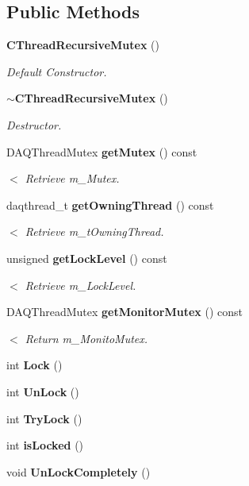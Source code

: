 \subsection*{Public Methods}
\begin{CompactItemize}
\item 
{\bf CThread\-Recursive\-Mutex} ()
\begin{CompactList}\small\item\em Default Constructor.\item\end{CompactList}\item 
{\bf $\sim$CThread\-Recursive\-Mutex} ()
\begin{CompactList}\small\item\em Destructor.\item\end{CompactList}\item 
DAQThread\-Mutex {\bf get\-Mutex} () const
\begin{CompactList}\small\item\em $<$ Retrieve m\_\-Mutex.\item\end{CompactList}\item 
daqthread\_\-t {\bf get\-Owning\-Thread} () const
\begin{CompactList}\small\item\em $<$ Retrieve m\_\-t\-Owning\-Thread.\item\end{CompactList}\item 
unsigned {\bf get\-Lock\-Level} () const
\begin{CompactList}\small\item\em $<$ Retrieve m\_\-Lock\-Level.\item\end{CompactList}\item 
DAQThread\-Mutex {\bf get\-Monitor\-Mutex} () const
\begin{CompactList}\small\item\em $<$ Return m\_\-Monito\-Mutex.\item\end{CompactList}\item 
int {\bf Lock} ()
\item 
int {\bf Un\-Lock} ()
\item 
int {\bf Try\-Lock} ()
\item 
int {\bf is\-Locked} ()
\item 
void {\bf Un\-Lock\-Completely} ()
\end{CompactItemize}
